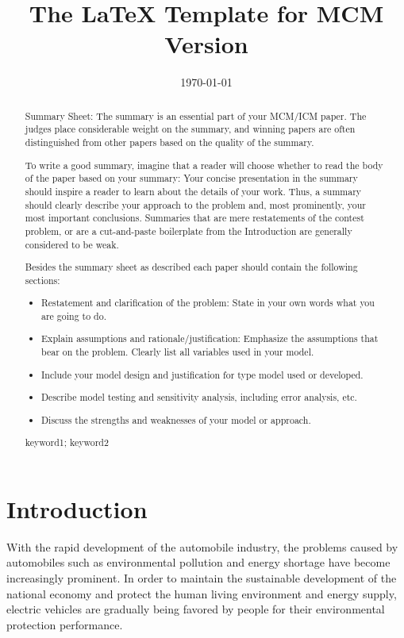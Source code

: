\documentclass{mcmthesis}
\title{The \LaTeX{} Template for MCM Version \MCMversion}
\date{\today}
\begin{document}
\begin{abstract}



Summary Sheet: The summary is an essential part of your MCM/ICM paper. 
The judges place considerable weight on the summary, 
and winning papers are often distinguished from other papers based on the quality of the summary.

To write a good summary, imagine that a reader will choose whether to read the body of the paper based on your summary: 
Your concise presentation in the summary should inspire a reader to learn about the details of your work. 
Thus, a summary should clearly describe your approach to the problem and, most prominently, your most important conclusions.  
Summaries that are mere restatements of the contest problem, or are a cut-and-paste boilerplate from the Introduction are generally considered to be weak.

Besides the summary sheet as described each paper should contain the following sections:

\begin{itemize}
\item Restatement and clarification of the problem: State in your own words what you are going to do.
\item Explain assumptions and rationale/justification: Emphasize the assumptions that bear on the problem. Clearly list all variables used in your model.
\item Include your model design and justification for type model used or developed.
\item Describe model testing and sensitivity analysis, including error analysis, etc.
\item Discuss the strengths and weaknesses of your model or approach.
\end{itemize}

\begin{keywords}
keyword1; keyword2
\end{keywords}

\end{abstract}
\maketitle
\section{Introduction}
With the rapid development of the automobile industry, the problems caused by automobiles such as environmental pollution and energy shortage have become increasingly prominent. In order to maintain the sustainable development of the national economy and protect the human living environment and energy supply, electric vehicles are gradually being favored by people for their environmental protection performance.
   
\end{document}
